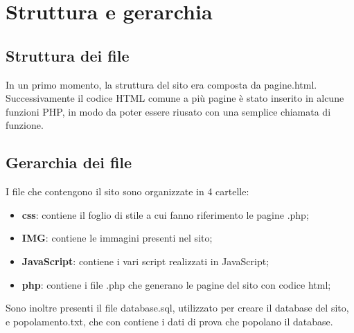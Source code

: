 \section{Struttura e gerarchia}
	\subsection{Struttura dei file}
	In un primo momento, la struttura del sito era composta da pagine.html. Successivamente il codice HTML comune a più pagine è stato inserito in alcune funzioni PHP, in modo da poter essere riusato con una semplice chiamata di funzione.
	
	\subsection{Gerarchia dei file}
	I file che contengono il sito sono organizzate in 4 cartelle: 
\begin{itemize}
	\item \textbf{css}: contiene il foglio di stile a cui fanno riferimento le pagine .php;
	\item \textbf{IMG}: contiene le immagini presenti nel sito;
	\item \textbf{JavaScript}: contiene i vari script realizzati in JavaScript;
	\item \textbf{php}: contiene i file .php che generano le pagine del sito con codice html;
\end{itemize}
Sono inoltre presenti il file database.sql, utilizzato per creare il database del sito, e popolamento.txt, che con contiene i dati di prova che popolano il database.

		


